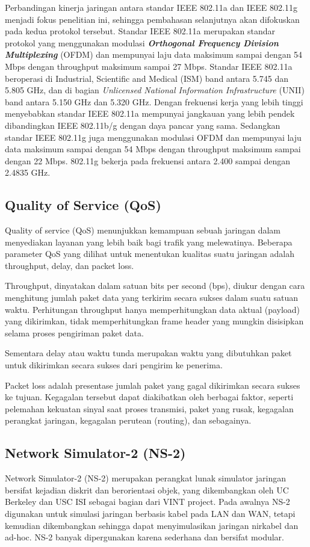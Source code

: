 \documentclass{jtetiproposalskripsi}
\begin{document}
Perbandingan kinerja jaringan antara standar IEEE 802.11a dan IEEE 802.11g menjadi fokus penelitian ini, sehingga pembahasan selanjutnya akan difokuskan pada kedua protokol tersebut. Standar IEEE 802.11a merupakan standar protokol yang menggunakan modulasi \textit{\textbf{Orthogonal Frequency Division Multiplexing}} (OFDM) dan mempunyai laju data maksimum sampai dengan 54 Mbps dengan throughput maksimum sampai 27 Mbps. Standar IEEE 802.11a beroperasi di Industrial, Scientific and Medical (ISM) band antara 5.745 dan 5.805 GHz, dan di bagian \textit{Unlicensed National Information Infrastructure} (UNII) band antara 5.150 GHz dan 5.320 GHz. Dengan frekuensi kerja yang lebih tinggi menyebabkan standar IEEE 802.11a mempunyai jangkauan yang lebih pendek dibandingkan IEEE 802.11b/g dengan daya pancar yang sama. Sedangkan standar IEEE 802.11g juga menggunakan modulasi OFDM dan mempunyai laju data maksimum sampai dengan 54 Mbps dengan throughput maksimum sampai dengan 22 Mbps. 802.11g bekerja pada frekuensi antara 2.400 sampai dengan 2.4835 GHz.


\subsection{Quality of Service (QoS)}
Quality of service (QoS) menunjukkan kemampuan sebuah jaringan dalam menyediakan layanan yang lebih baik bagi trafik yang melewatinya. Beberapa parameter QoS yang dilihat untuk menentukan kualitas suatu jaringan adalah throughput, delay, dan packet loss.

Throughput, dinyatakan dalam satuan bits per second (bps), diukur dengan cara menghitung jumlah paket data yang terkirim secara sukses dalam suatu satuan waktu. Perhitungan throughput hanya memperhitungkan data aktual (payload) yang dikirimkan, tidak memperhitungkan frame header yang mungkin disisipkan selama proses pengiriman paket data.

Sementara delay atau waktu tunda merupakan waktu yang dibutuhkan paket untuk dikirimkan secara sukses dari pengirim ke penerima.

Packet loss adalah presentase jumlah paket yang gagal dikirimkan secara sukses ke tujuan. Kegagalan tersebut dapat diakibatkan oleh berbagai faktor, seperti pelemahan kekuatan sinyal saat proses transmisi, paket yang rusak, kegagalan perangkat jaringan, kegagalan perutean (routing), dan sebagainya.


\subsection{Network Simulator-2 (NS-2)}
Network Simulator-2 (NS-2) merupakan perangkat lunak simulator jaringan bersifat kejadian diskrit dan berorientasi objek, yang dikembangkan oleh UC Berkeley dan USC ISI sebagai bagian dari VINT project. Pada awalnya NS-2 digunakan untuk simulasi jaringan berbasis kabel pada LAN dan WAN, tetapi kemudian dikembangkan sehingga dapat menyimulasikan jaringan nirkabel dan ad-hoc. NS-2 banyak dipergunakan karena sederhana dan bersifat modular.
\end{document}
